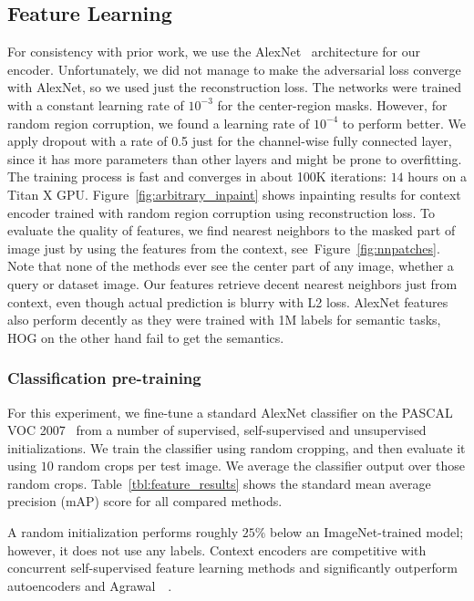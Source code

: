 \documentclass[10pt,twocolumn,letterpaper]{article}
\newcommand{\reffig}[1]{Figure~\ref{fig:#1}}
\newcommand{\reftbl}[1]{Table~\ref{tbl:#1}}
\newcommand{\lblsec}[1]{\label{sec:#1}}
\begin{document}
\subsection{Feature Learning}
\lblsec{feature}
For consistency with prior work, we use the AlexNet~\cite{krizhevsky2012imagenet} architecture for our encoder.
Unfortunately, we did not manage to make the adversarial loss converge with AlexNet, so we used just the reconstruction loss.
The networks were trained with a constant learning rate of $10^{-3}$ for the center-region masks.
However, for random region corruption, we found a learning rate of $10^{-4}$ to perform better.
We apply dropout with a rate of 0.5 just for the channel-wise fully connected layer, since it has more parameters than other layers and might be prone to overfitting.
The training process is fast and converges in about 100K iterations: $14$ hours on a Titan X GPU.
\reffig{arbitrary_inpaint} shows inpainting results for context encoder trained with random region corruption using reconstruction loss.
To evaluate the quality of features, we find nearest neighbors to the masked part of image just by using the features from the context, see~\reffig{nnpatches}.
Note that none of the methods ever see the center part of any image, whether a query or dataset image.
Our features retrieve decent nearest neighbors just from context, even though actual prediction is blurry with L2 loss.
AlexNet features also perform decently as they were trained with 1M labels for semantic tasks, HOG on the other hand fail to get the semantics.

\subsubsection{Classification pre-training}
\label{sec:class}
For this experiment, we fine-tune a standard AlexNet classifier on the PASCAL VOC 2007~\cite{everingham2014pascal} from a number of supervised, self-supervised and unsupervised initializations.
We train the classifier using random cropping, and then evaluate it using $10$ random crops per test image.
We average the classifier output over those random crops.
\reftbl{feature_results} shows the standard mean average precision (mAP) score for all compared methods.

%
A random initialization performs roughly $25\%$ below an ImageNet-trained model; however, it does not use any labels.
Context encoders are competitive with concurrent self-supervised feature learning methods \cite{doersch2015unsupervised,wang2015unsupervised} and significantly outperform autoencoders and Agrawal~\etal~\cite{agrawal2015learning}.
%
%
%
%
%
\end{document}
